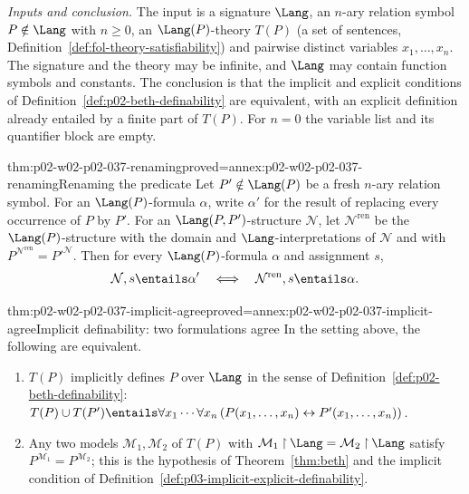 \emph{Inputs and conclusion.}  The input is a signature \(\Lang\), an
\(n\)-ary relation symbol \(P\notin\Lang\) with \(n\geq0\), an
\(\Lang(P)\)-theory \(T(P)\) (a set of sentences,
Definition~\ref{def:fol-theory-satisfiability}) and pairwise distinct
variables \(x_1,\ldots,x_n\).  The signature and the theory may be
infinite, and \(\Lang\) may contain function symbols and constants.  The
conclusion is that the implicit and explicit conditions of
Definition~\ref{def:p02-beth-definability} are equivalent, with an
explicit definition already entailed by a finite part of \(T(P)\).  For
\(n=0\) the variable list and its quantifier block are empty.

\begin{hblemma}{thm:p02-w02-p02-037-renaming}{proved=annex:p02-w02-p02-037-renaming}{Renaming the predicate}
Let \(P'\notin\Lang(P)\) be a fresh \(n\)-ary relation symbol.  For an
\(\Lang(P)\)-formula \(\alpha\), write \(\alpha'\) for the result of
replacing every occurrence of \(P\) by \(P'\).  For an
\(\Lang(P,P')\)-structure \(\mathcal N\), let \(\mathcal N^{\mathrm{ren}}\) be the
\(\Lang(P)\)-structure with the domain and \(\Lang\)-interpretations of
\(\mathcal N\) and with \(P^{\mathcal N^{\mathrm{ren}}}=P'^{\mathcal N}\).  Then
for every \(\Lang(P)\)-formula \(\alpha\) and assignment \(s\),
\[
 \mathcal N,s\entails\alpha'
 \quad\Longleftrightarrow\quad
 \mathcal N^{\mathrm{ren}},s\entails\alpha .
\]
\end{hblemma}

\begin{hblemma}{thm:p02-w02-p02-037-implicit-agree}{proved=annex:p02-w02-p02-037-implicit-agree}{Implicit definability: two formulations agree}
In the setting above, the following are equivalent.
\begin{enumerate}
 \item \(T(P)\) implicitly defines \(P\) over \(\Lang\) in the sense of
       Definition~\ref{def:p02-beth-definability}:
       \(T(P)\cup T(P')\entails\forall x_1\cdots\forall x_n\,
       (P(x_1,\ldots,x_n)\leftrightarrow P'(x_1,\ldots,x_n))\).
 \item Any two models \(\mathcal M_1,\mathcal M_2\) of \(T(P)\) with
       \(\mathcal M_1\mathbin{\upharpoonright}\Lang=\mathcal M_2\mathbin{\upharpoonright}\Lang\) satisfy
       \(P^{\mathcal M_1}=P^{\mathcal M_2}\); this is the hypothesis of
       Theorem~\ref{thm:beth} and the implicit condition of
       Definition~\ref{def:p03-implicit-explicit-definability}.
\end{enumerate}
\end{hblemma}

